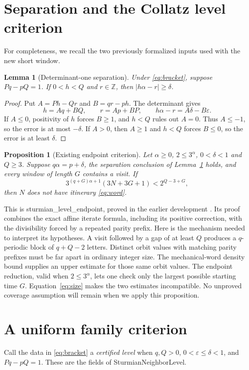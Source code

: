 \documentclass[11pt]{article}
\newtheorem{lemma}[theorem]{Lemma}
\newtheorem{proposition}[theorem]{Proposition}
\theoremstyle{remark}
\newcommand{\Z}{\mathbb Z}
\newcommand{\code}[1]{{\small\ttfamily #1}}
\begin{document}
\section{Separation and the Collatz level criterion}
For completeness, we recall the two previously formalized inputs used
with the new short window.

\begin{lemma}[Determinant-one separation]\label{lem:sep}
Under \eqref{eq:bracket}, suppose $Pq-pQ=1$. If $0<h<Q$ and $r\in\Z$,
then $|h\alpha-r|\ge\delta$.
\end{lemma}
\begin{proof}
Put $A=Ph-Qr$ and $B=qr-ph$. The determinant gives
\[
h=Aq+BQ,\qquad r=Ap+BP,\qquad h\alpha-r=A\delta-B\varepsilon.
\]
If $A\le0$, positivity of $h$ forces $B\ge1$, and $h<Q$ rules out
$A=0$. Thus $A\le-1$, so the error is at most $-\delta$.
If $A>0$, then $A\ge1$ and $h<Q$ forces $B\le0$, so the error is
at least $\delta$.
\end{proof}

\begin{proposition}[Existing endpoint criterion]\label{prop:level}
Let $\alpha\ge0$, $2\le3^\alpha$, $0<\delta<1$ and $Q\ge3$.
Suppose $q\alpha=p+\delta$, the separation conclusion of
Lemma~\ref{lem:sep} holds, and every window of length $G$ contains a
visit. If
\begin{equation}\label{eq:size}
3^{(q+G)\alpha+1}(3N+3G+1)<2^{Q-3+G},
\end{equation}
then $N$ does not have itinerary \eqref{eq:word}.
\end{proposition}
This is \code{sturmian\_\allowbreak{}level\_\allowbreak{}endpoint}, proved in
the earlier development \cite{silver,rung1}. Its proof combines the
exact affine iterate formula, including its positive correction, with
the divisibility forced by a repeated parity prefix.
Here is the mechanism needed to interpret its hypotheses. A visit
followed by a gap of at least $Q$ produces a $q$-periodic block of
$q+Q-2$ letters. Distinct orbit values with matching parity prefixes
must be far apart in ordinary integer size. The mechanical-word density
bound supplies an upper estimate for those same orbit values. The
endpoint reduction, valid when $2\le3^\alpha$, lets one check only the
largest possible starting time $G$. Equation~\eqref{eq:size} makes the
two estimates incompatible. No unproved coverage assumption will remain
when we apply this proposition.

\section{A uniform family criterion}
Call the data in \eqref{eq:bracket} a \emph{certified level} when
$q,Q>0$, $0<\varepsilon\le\delta<1$, and $Pq-pQ=1$.
These are the fields of \code{SturmianNeighborLevel}.
\end{document}
